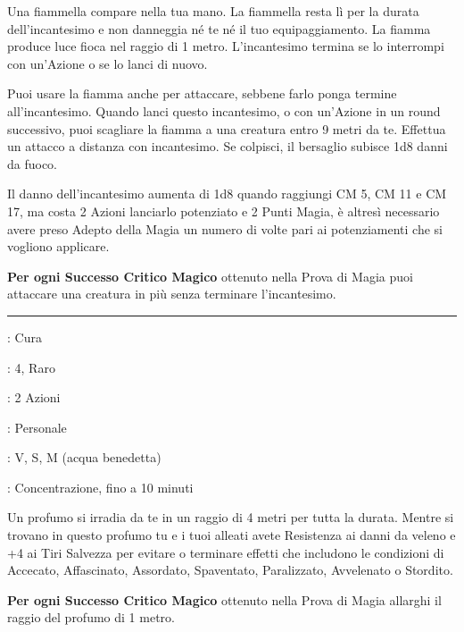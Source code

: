 \begin{multicols}{2}
Una fiammella compare nella tua mano. La fiammella resta lì per la durata dell'incantesimo e non danneggia né te né il tuo equipaggiamento. La fiamma produce luce fioca nel raggio di 1 metro. L'incantesimo termina se lo interrompi con un'Azione o se lo lanci di nuovo.

Puoi usare la fiamma anche per attaccare, sebbene farlo ponga termine all'incantesimo. Quando lanci questo incantesimo, o con un'Azione in un round successivo, puoi scagliare la fiamma a una creatura entro 9 metri da te. Effettua un attacco a distanza con incantesimo. Se colpisci, il bersaglio subisce 1d8 danni da fuoco.

Il danno dell'incantesimo aumenta di 1d8 quando raggiungi CM 5, CM 11 e CM 17, ma costa 2 Azioni lanciarlo potenziato e 2 Punti Magia, è altresì necessario avere preso Adepto della Magia un numero di volte pari ai potenziamenti che si vogliono applicare.

\textbf{Per ogni Successo Critico Magico} ottenuto nella Prova di Magia puoi attaccare una creatura in più senza terminare l'incantesimo.


\smallskip\noindent\rule{\linewidth}{2pt} \hypertarget{Profumo di Atherim}{}\medskip{}\label{Aura of Purity}
\noindent
\begin{description}[noitemsep, topsep=0pt, parsep=0pt, partopsep=0pt, leftmargin=0cm, labelwidth=2.8cm]
	\item[\textbf{Lista di Magia}] : Cura
	\item[\textbf{Livello}] : 4, Raro
	\item[\textbf{T. di Lancio}] : 2 Azioni
	\item[\textbf{Gittata}] : Personale
	\item[\textbf{Componenti}] : V, S, M (acqua benedetta)
	\item[\textbf{Durata}] : Concentrazione, fino a 10 minuti
\end{description}

Un profumo si irradia da te in un raggio di 4 metri per tutta la durata. Mentre si trovano in questo profumo tu e i tuoi alleati avete Resistenza ai danni da veleno e +4 ai Tiri Salvezza per evitare o terminare effetti che includono le condizioni di Accecato, Affascinato, Assordato, Spaventato, Paralizzato, Avvelenato o Stordito.

\textbf{Per ogni Successo Critico Magico} ottenuto nella Prova di Magia allarghi il raggio del profumo di 1 metro.


\end{multicols}
